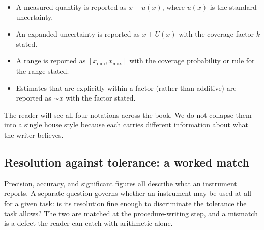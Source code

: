 \begin{itemize}[leftmargin=*]
  \item A measured quantity is reported as $x \pm u(x)$, where $u(x)$
    is the standard uncertainty.
  \item An expanded uncertainty is reported as $x \pm U(x)$ with the
    coverage factor $k$ stated.
  \item A range is reported as $[x_{\min}, x_{\max}]$ with the
    coverage probability or rule for the range stated.
  \item Estimates that are explicitly within a factor (rather than
    additive) are reported as $\sim x$ with the factor stated.
\end{itemize}

The reader will see all four notations across the book. We do not
collapse them into a single house style because each carries
different information about what the writer believes.

\subsection{Resolution against tolerance: a worked match}

Precision, accuracy, and significant figures all describe what an
instrument reports. A separate question governs whether an instrument
may be used at all for a given task: is its resolution fine enough to
discriminate the tolerance the task allows? The two are matched at the
procedure-writing step, and a mismatch is a defect the reader can catch
with arithmetic alone.

